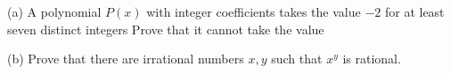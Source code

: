 (a) A polynomial $P(x)$ with integer coefficients takes the value $-2$ for at least seven distinct integers  Prove that it cannot take the value 

(b) Prove that there are irrational numbers $x,y$ such that $x^y$ is rational.